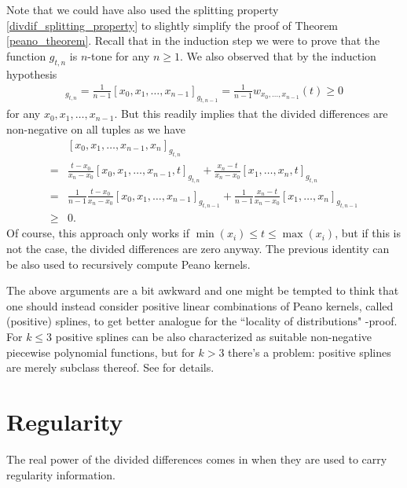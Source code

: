 Note that we could have also used the splitting property \ref{divdif_splitting_property} to slightly simplify the proof of Theorem \ref{peano_theorem}. Recall that in the induction step we were to prove that the function $g_{t, n}$ is $n$-tone for any $n \geq 1$. We also observed that by the induction hypothesis
\begin{align*}
	[x_{0}, x_{1}, \ldots, x_{n - 1}, t]_{g_{t, n}} = \frac{1}{n - 1}[x_{0}, x_{1}, \ldots, x_{n - 1}]_{g_{t, n - 1}} =  \frac{1}{n - 1} w_{x_{0}, \ldots, x_{n - 1}}(t)\geq 0
\end{align*}
for any $x_{0}, x_{1}, \ldots, x_{n - 1}$. But this readily implies that the divided differences are non-negative on all tuples as we have
\begin{align*}
	& [x_{0}, x_{1}, \ldots, x_{n - 1}, x_{n}]_{g_{t, n}} \\
	=& \frac{t - x_{0}}{x_{n} - x_{0}} [x_{0}, x_{1}, \ldots, x_{n - 1}, t]_{g_{t, n}} + \frac{x_{n} - t}{x_{n} - x_{0}} [x_{1}, \ldots, x_{n}, t]_{g_{t, n}} \\
	=& \frac{1}{n - 1} \frac{t - x_{0}}{x_{n} - x_{0}} [x_{0}, x_{1}, \ldots, x_{n - 1}]_{g_{t, n - 1}} + \frac{1}{n - 1}\frac{x_{n} - t}{x_{n} - x_{0}} [x_{1}, \ldots, x_{n}]_{g_{t, n - 1}} \\
	\geq & 0.
\end{align*}
Of course, this approach only works if $\min(x_{i}) \leq t \leq \max(x_{i})$, but if this is not the case, the divided differences are zero anyway. The previous identity can be also used to recursively compute Peano kernels.

\begin{huom}
	The above arguments are a bit awkward and one might be tempted to think that one should instead consider positive linear combinations of Peano kernels, called (positive) splines, to get better analogue for the ``locality of distributions" -proof. For $k \leq 3$ positive splines can be also characterized as suitable non-negative piecewise polynomial functions, but for $k > 3$ there's a problem: positive splines are merely subclass thereof. See \cite{deBoor} for details.
\end{huom}

\section{Regularity}

The real power of the divided differences comes in when they are used to carry regularity information.

